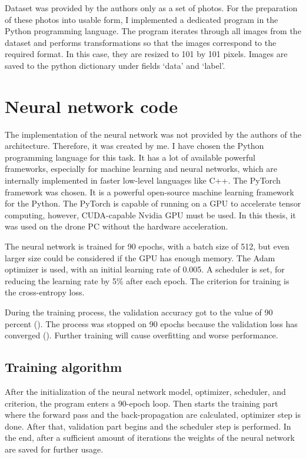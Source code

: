 Dataset was provided by the authors only as a set of photos. For the preparation of these photos into usable form, I implemented a dedicated program in the Python programming language. The program iterates through all images from the dataset and performs transformations so that the images correspond to the required format. In this case, they are resized to 101 by 101 pixels. Images are saved to the python dictionary under fields ‘data’ and ‘label’.

\section{Neural network code}

The implementation of the neural network was not provided by the authors of the architecture. Therefore, it was created by me. I have chosen the Python programming language for this task. It has a lot of available powerful frameworks, especially for machine learning and neural networks, which are internally implemented in faster low-level languages like C++. The PyTorch framework was chosen. It is a powerful open-source machine learning framework for the Python. The PyTorch is capable of running on a \acs{GPU} to accelerate tensor computing, however, CUDA-capable Nvidia \acs{GPU} must be used. In this thesis, it was used on the drone PC without the hardware acceleration.

The neural network is trained for 90 epochs, with a batch size of 512, but even larger size could be considered if the GPU has enough memory. The Adam optimizer is used, with an initial learning rate of 0.005. A scheduler is set, for reducing the learning rate by 5\% after each epoch. The criterion for training is the cross-entropy loss. 

During the training process, the validation accuracy got to the value of 90 percent (). The process was stopped on 90 epochs because the validation loss has converged (). Further training will cause overfitting and worse performance.

\subsection{Training algorithm}

After the initialization of the neural network model, optimizer, scheduler, and criterion, the program enters a 90-epoch loop. Then starts the training part where the forward pass and the back-propagation are calculated, optimizer step is done. After that, validation part begins and the scheduler step is performed. In the end, after a sufficient amount of iterations the weights of the neural network are saved for further usage.

